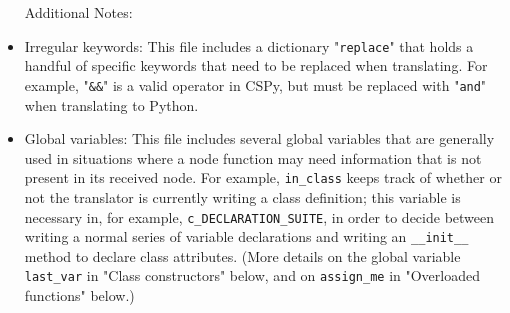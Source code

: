\documentclass{article}
\begin{document}
\begin{itemize}
Additional Notes:
\item Irregular keywords: This file includes a dictionary "\verb|replace|" that holds a handful of specific keywords that need to be replaced when translating. For example, "\verb|&&|" is a valid operator in CSPy, but must be replaced with "\verb|and|" when translating to Python.
\item Global variables: This file includes several global variables that are generally used in situations where a node function may need information that is not present in its received node. For example, \verb|in_class| keeps track of whether or not the translator is currently writing a class definition; this variable is necessary in, for example, \verb|c_DECLARATION_SUITE|, in order to decide between writing a normal series of variable declarations and writing an \verb|__init__| method to declare class attributes. (More details on the global variable \verb|last_var| in "Class constructors" below, and on \verb|assign_me| in "Overloaded functions" below.)


\end{itemize}
\end{document}

